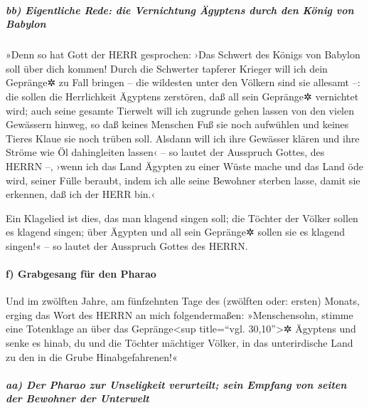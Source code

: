 \hypertarget{bb-eigentliche-rede-die-vernichtung-uxe4gyptens-durch-den-kuxf6nig-von-babylon}{%
\subparagraph{bb) Eigentliche Rede: die Vernichtung Ägyptens durch den
König von
Babylon}\label{bb-eigentliche-rede-die-vernichtung-uxe4gyptens-durch-den-kuxf6nig-von-babylon}}

»Denn so hat Gott der HERR gesprochen: ›Das Schwert des
Königs von Babylon soll über dich kommen! Durch die
Schwerter tapferer Krieger will ich dein Gepränge✲ zu Fall bringen --
die wildesten unter den Völkern sind sie allesamt --: die sollen die
Herrlichkeit Ägyptens zerstören, daß all sein Gepränge✲ vernichtet wird;
auch seine gesamte Tierwelt will ich zugrunde gehen
lassen von den vielen Gewässern hinweg, so daß keines Menschen Fuß sie
noch aufwühlen und keines Tieres Klaue sie noch trüben soll.
Alsdann will ich ihre Gewässer klären und ihre Ströme wie
Öl dahingleiten lassen‹ -- so lautet der Ausspruch Gottes, des HERRN --,
›wenn ich das Land Ägypten zu einer Wüste mache und das
Land öde wird, seiner Fülle beraubt, indem ich alle seine Bewohner
sterben lasse, damit sie erkennen, daß ich der HERR bin.‹

Ein Klagelied ist dies, das man klagend singen soll; die
Töchter der Völker sollen es klagend singen; über Ägypten und all sein
Gepränge✲ sollen sie es klagend singen!« -- so lautet der Ausspruch
Gottes des HERRN.

\hypertarget{f-grabgesang-fuxfcr-den-pharao}{%
\paragraph{f) Grabgesang für den
Pharao}\label{f-grabgesang-fuxfcr-den-pharao}}

Und im zwölften Jahre, am fünfzehnten Tage des (zwölften
oder: ersten) Monats, erging das Wort des HERRN an mich folgendermaßen:
»Menschensohn, stimme eine Totenklage an über das
Gepränge\textless sup title=``vgl. 30,10''\textgreater✲ Ägyptens und
senke es hinab, du und die Töchter mächtiger Völker, in das
unterirdische Land zu den in die Grube Hinabgefahrenen!«

\hypertarget{aa-der-pharao-zur-unseligkeit-verurteilt-sein-empfang-von-seiten-der-bewohner-der-unterwelt}{%
\subparagraph{aa) Der Pharao zur Unseligkeit verurteilt; sein Empfang
von seiten der Bewohner der
Unterwelt}\label{aa-der-pharao-zur-unseligkeit-verurteilt-sein-empfang-von-seiten-der-bewohner-der-unterwelt}}

